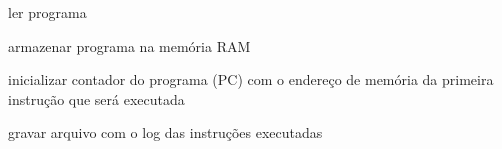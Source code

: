 \begin{algorithm}[ht]
{        \BlankLine

        ler programa

        \BlankLine

        armazenar programa na memória RAM

        \BlankLine

        inicializar contador do programa (PC) com o endereço de memória da primeira instrução que será executada

        \BlankLine
        

        \BlankLine

        gravar arquivo com o log das instruções executadas

    } 

\end{algorithm}